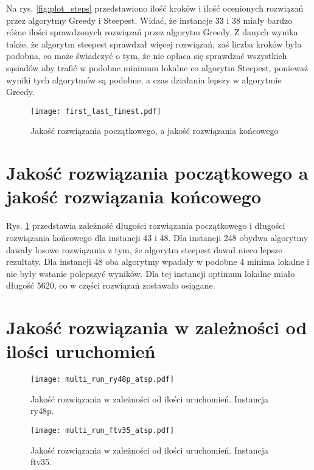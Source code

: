 \documentclass{article}
\begin{document}
Na rys. \ref{fig:plot_steps} przedstawiono ilość kroków i ilość ocenionych rozwiązań przez algorytmy Greedy i Steepest. Widać, że instancje 33 i 38 miały bardzo różne ilości sprawdzonych rozwiązań przez algorytm Greedy. Z danych wynika także, że algorytm steepest sprawdzał więcej rozwiązań, zaś liczba kroków była podobna, co może świadczyć o tym, że nie opłaca się sprawdzać wszystkich sąsiadów aby trafić w podobne minimum lokalne co algorytm Steepest, ponieważ wyniki tych algorytmów są podobne, a czas działania lepszy w algorytmie Greedy.




\begin{figure}[H]
    \begin{center}
        \texttt{[image: first\_last\_finest.pdf]}
    \end{center}
    \caption{Jakość rozwiązania początkowego, a jakość rozwiązania końcowego}
    \label{fig:first_finnest}
\end{figure}


\section{Jakość rozwiązania początkowego a jakość rozwiązania końcowego}

Rys. \ref{fig:first_finnest} przedstawia zależność długości rozwiązania początkowego i długości rozwiązania końcowego dla instancji 43 i 48. Dla instancji 248 obydwa algorytmy dawały losowe rozwiązania z tym, że algorytm steepest dawał nieco lepsze rezultaty. Dla instancji 48 oba algorytmy wpadały w podobne 4 minima lokalne i nie były wstanie polepszyć wyników. Dla tej instancji optimum lokalne miało długość 5620, co w części rozwiązań zostawało osiągane.

\section{Jakość rozwiązania w zależności od ilości uruchomień}

\begin{figure}[H]
    \begin{center}
        \texttt{[image: multi\_run\_ry48p\_atsp.pdf]}
    \end{center}
    \caption{Jakość rozwiązania w zależności od ilości uruchomień. Instancja ry48p.}
    \label{fig:plot_multi_run_ry48p}
\end{figure}

\begin{figure}[H]
    \begin{center}
        \texttt{[image: multi\_run\_ftv35\_atsp.pdf]}
    \end{center}
    \caption{Jakość rozwiązania w zależności od ilości uruchomień. Instancja ftv35.}
    \label{fig:plot_multi_run_ftv35}
\end{figure}
\end{document}
